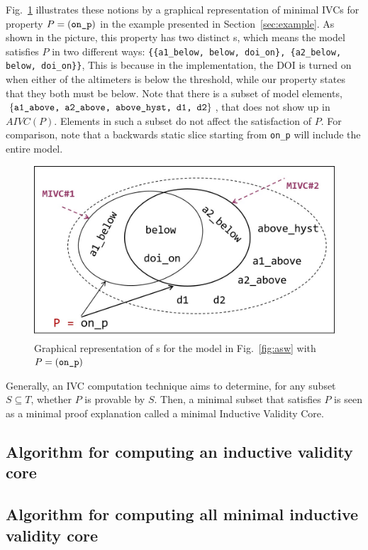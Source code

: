 Fig.~\ref{fig:ivcs} illustrates these notions by a graphical representation of minimal IVCs for property $P = ({\small{\texttt{on\_p}}})$ in the example presented in Section~\ref{sec:example}. As shown in the picture, this property has two distinct \mivc s, which means the model satisfies $P$ in two different ways:  {\small \texttt{\{\{a1\_below, below, doi\_on\}, \{a2\_below, below, doi\_on\}\}}}, This is because in the implementation, the DOI is turned on when either of the altimeters is below the threshold, while our property states that they both must be below.
Note that there is a subset of model elements, $\{{\small \texttt{a1\_above, a2\_above, above\_hyst, d1, d2}}\}$, that does not show up in $AIVC(P)$. Elements in such a subset
do not affect the satisfaction of $P$.  For comparison, note that a backwards static slice starting from {\small{\texttt{on\_p}}} will include the entire model.

\begin{figure}[t]
 \centering
  \includegraphics[width=0.9\columnwidth]{figs/ivcs.jpg}
  \vspace{-0.1in}
  \caption{Graphical representation of \mivc s for the model in Fig.~\ref{fig:asw}
  with  $P = ({\small \texttt{on\_p}})$}
  \label{fig:ivcs}
\end{figure}


Generally, an IVC computation technique aims to determine, for any subset $S \subseteq T$, whether $P$ is provable by $S$. Then, a minimal subset that satisfies $P$ is seen as a minimal proof explanation called a minimal Inductive Validity Core.


\subsection{Algorithm for computing an inductive validity core}




\subsection{Algorithm for computing all minimal inductive validity core}
 
